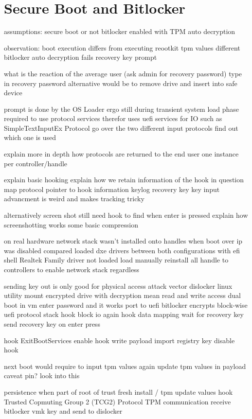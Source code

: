 \section{Secure Boot and Bitlocker}
assumptions:
secure boot or not
bitlocker enabled with TPM auto decryption

observation:
boot execution differs from executing reootkit
tpm values different
bitlocker auto decryption fails
recovery key prompt

what is the reaction of the average user
(ask admin for recovery password)
type in recovery password
alternative would be to remove drive and insert into safe device

prompt is done by the OS Loader
ergo still during transient system load phase
required to use protocol services
therefor uses uefi services for IO
such as SimpleTextInputEx Protocol
go over the two different input protocols
find out which one is used

explain more in depth how protocols are returned to the end user
one instance per controller/handle

explain basic hooking
explain how we retain information of the hook in question
map protocol pointer to hook information
keylog recovery key
key input advancment is weird and makes tracking tricky

alternatively screen shot
still need hook to find when enter is pressed
explain how screenshotting works
some basic compression

on real hardware
network stack wasn't installed onto handles when boot over ip was disabled
compared loaded dxe drivers between both configurations with efi shell
Realtek Family driver not loaded
load manually
reinstall all handle to controllers to enable network stack regardless

sending key out is only good for physical access attack vector
dislocker linux utility
mount encrypted drive with decryption mean
read and write access
dual boot in vm
enter password and it works
port to uefi
bitlocker encrypts block-wise
uefi protocol stack
hook block io
again hook data mapping
wait for recovery key
send recovery key on enter press

hook ExitBootServices
enable hook
write payload
import registry key
disable hook

next boot would require to input tpm values again
update tpm values in payload
caveat pin? look into this

persistence when part of root of trust
fresh install / tpm update values
hook Trusted Copmuting Group 2 (TCG2) Protocol
TPM communication
receive bitlocker vmk key and send to dislocker